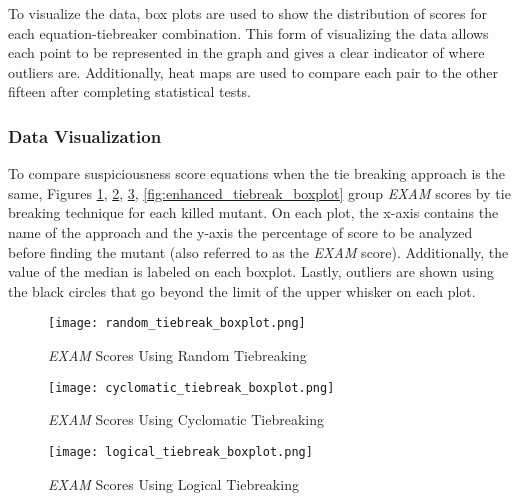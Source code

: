 To visualize the data, box plots are
used to show the distribution of scores for each equation-tiebreaker
combination. This form of visualizing the data allows each point to be
represented in the graph and gives a clear indicator of where outliers are.
Additionally, heat maps are used to compare each pair to the other fifteen after
completing statistical tests.

\subsubsection{Data Visualization}
\label{subsubsec:data_vizualization}

To compare suspiciousness score equations when the tie breaking approach is the
same, Figures \ref{fig:random_tiebreak_boxplot},
\ref{fig:cyclomatic_tiebreak_boxplot}, \ref{fig:logical_tiebreak_boxplot},
\ref{fig:enhanced_tiebreak_boxplot}
group \emph{EXAM} scores by tie breaking technique for each killed mutant. On
each plot, the x-axis contains the name of the approach and the y-axis the
percentage of score to be analyzed before finding the mutant (also referred to
as the \emph{EXAM} score). Additionally, the value of the median is labeled on
each boxplot. Lastly, outliers are shown using the black circles that go beyond
the limit of the upper whisker on each plot.

\begin{figure}[!htb]
	\begin{center}
		\texttt{[image: random\_tiebreak\_boxplot.png]}
		\caption{\label{fig:random_tiebreak_boxplot} \emph{EXAM} Scores Using
		Random Tiebreaking}
	\end{center}
\end{figure}

\begin{figure}[!htb]
	\begin{center}
		\texttt{[image: cyclomatic\_tiebreak\_boxplot.png]}
		\caption{\label{fig:cyclomatic_tiebreak_boxplot} \emph{EXAM} Scores Using
		Cyclomatic Tiebreaking}
	\end{center}
\end{figure}

\begin{figure}[!htb]
	\begin{center}
		\texttt{[image: logical\_tiebreak\_boxplot.png]}
		\caption{\label{fig:logical_tiebreak_boxplot} \emph{EXAM} Scores Using
		Logical Tiebreaking}
	\end{center}
\end{figure}

